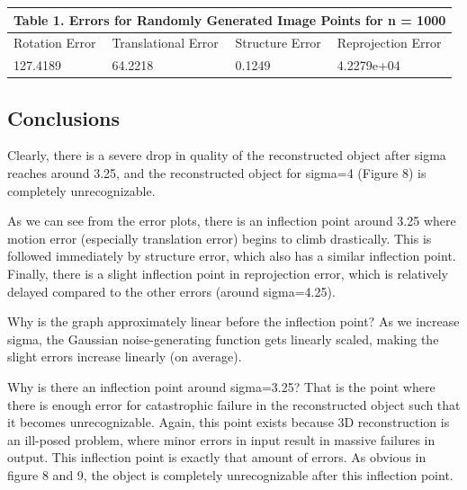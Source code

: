 \documentclass{article}
\begin{document}
\begin{tabular}{ |p{3cm}|p{3cm}|p{3cm}|p{3cm}|  }
 \hline
 \multicolumn{4}{|c|}{Table 1. Errors for Randomly Generated Image Points for n = 1000} \\ \hline
 \hline
 Rotation Error & Translational Error & Structure Error & Reprojection Error\\
 \hline
 127.4189 & 64.2218 & 0.1249 & 4.2279e+04\\
 \hline
\end{tabular}



\subsection{Conclusions}

Clearly, there is a severe drop in quality of the reconstructed object after sigma reaches around 3.25, and the reconstructed object for sigma=4 (Figure 8) is completely unrecognizable.

As we can see from the error plots, there is an inflection point around 3.25 where motion error (especially translation error) begins to climb drastically. This is followed immediately by structure error, which also has a similar inflection point. Finally, there is a slight inflection point in reprojection error, which is relatively delayed compared to the other errors (around sigma=4.25).


Why is the graph approximately linear before the inflection point? As we increase sigma, the Gaussian noise-generating function gets linearly scaled, making the slight errors increase linearly (on average).

Why is there an inflection point around sigma=3.25? That is the point where there is enough error for catastrophic failure in the reconstructed object such that it becomes unrecognizable. Again, this point exists because 3D reconstruction is an ill-posed problem, where minor errors in input result in massive failures in output. This inflection point is exactly that amount of errors. As obvious in figure 8 and 9, the object is completely unrecognizable after this inflection point.

\end{document}
